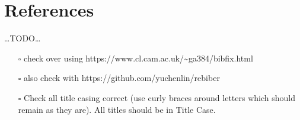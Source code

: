 \documentclass[12pt,a4paper,]{report}
\providecommand{\tightlist}{%
  \setlength{\itemsep}{0pt}\setlength{\parskip}{0pt}}
\begin{document}
\footnotesize
\singlespacing
\setlength{\parindent}{0in}

\hypertarget{references}{%
\chapter{References}\label{references}}

\ldots TODO\ldots{}

\begin{itemize}
\tightlist
\item[$\square$]
  check over using
  https://www.cl.cam.ac.uk/\textasciitilde ga384/bibfix.html
\item[$\square$]
  also check with https://github.com/yuchenlin/rebiber
\item[$\square$]
  Check all title casing correct (use curly braces around letters which
  should remain as they are). All titles should be in Title Case.
\end{itemize}
\end{document}
